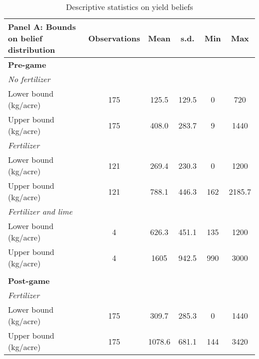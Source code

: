 \begin{table}[htbp]
\centering
\hspace*{-1.2cm}
\begin{threeparttable}
\caption{Descriptive statistics on yield beliefs}
\label{tab:expbounds}
\begin{tabular}{l ccccc}
\hline
\hline
Panel A: Bounds on belief distribution                    &Observations&        Mean&        s.d.&         Min&         Max\\
\hline
\textbf{Pre-game} & & & & \\ \textit{No fertilizer}&            &            &            &            &            \\
\hspace{0.1cm} Lower bound (kg/acre)&         175&       125.5&       129.5&           0&         720\\
\hspace{0.1cm} Upper bound (kg/acre)&         175&       408.0&       283.7&           9&        1440\\
\textit{Fertilizer} &            &            &            &            &            \\
\hspace{0.1cm} Lower bound (kg/acre)&         121&       269.4&       230.3&           0&        1200\\
\hspace{0.1cm} Upper bound (kg/acre)&         121&       788.1&       446.3&         162&      2185.7\\
\textit{Fertilizer and lime}&            &            &            &            &            \\
\hspace{0.1cm} Lower bound (kg/acre)&           4&       626.3&       451.1&         135&        1200\\
\hspace{0.1cm} Upper bound (kg/acre)&           4&        1605&       942.5&         990&        3000\\
 & & & & & \\
%
\textbf{Post-game} & & & & \\ \textit{Fertilizer}&            &            &            &            &            \\
\hspace{0.1cm} Lower bound (kg/acre)&         175&       309.7&       285.3&           0&        1440\\
\hspace{0.1cm} Upper bound (kg/acre)&         175&      1078.6&       681.1&         144&        3420\\

\end{tabular}
\end{threeparttable}
\end{table}
